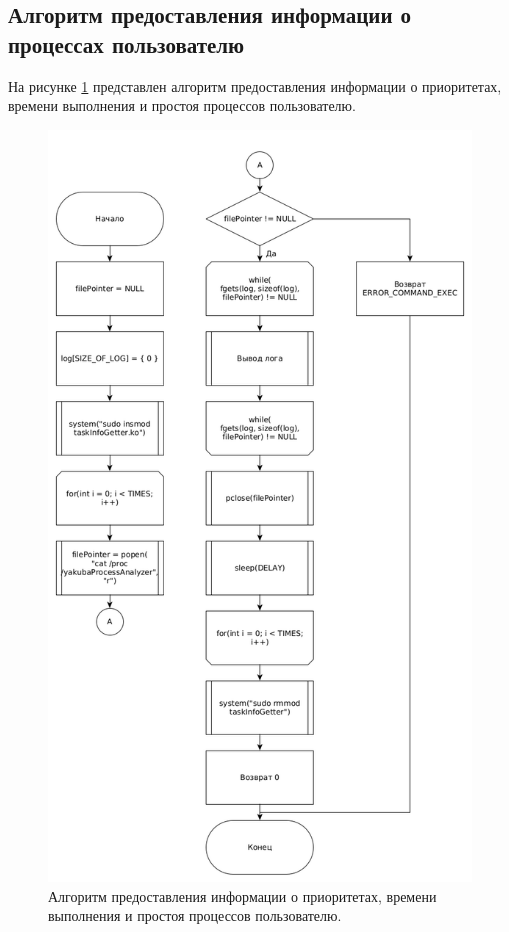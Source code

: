 \subsection{Алгоритм предоставления информации о процессах пользователю}
На рисунке \ref{fig:logger} представлен алгоритм предоставления информации о приоритетах, времени выполнения и простоя процессов пользователю.

\begin{figure}[H]
	\centering
	\includegraphics[scale=0.5]{img/starterLogger.png}
	\caption{Алгоритм предоставления информации о приоритетах, времени выполнения и простоя процессов пользователю. }
	\label{fig:logger}
\end{figure}

